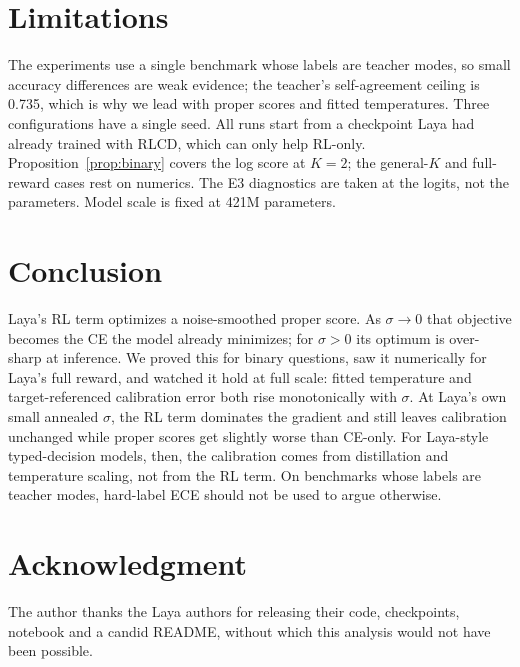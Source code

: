 \documentclass[conference]{IEEEtran}
\begin{document}
\section{Limitations}

The experiments use a single benchmark whose labels are
teacher modes, so small accuracy differences are weak evidence; the teacher's
self-agreement ceiling is 0.735, which is why we lead with proper scores and
fitted temperatures. Three configurations have a single seed. All runs start
from a checkpoint Laya had already trained with RLCD, which can only help
RL-only. Proposition~\ref{prop:binary} covers the log score at $K{=}2$; the
general-$K$ and full-reward cases rest on numerics. The E3 diagnostics are
taken at the logits, not the parameters. Model scale is fixed at 421M
parameters.

\section{Conclusion}

Laya's RL term optimizes a noise-smoothed proper score. As $\sigma\to0$ that
objective becomes the CE the model already minimizes; for $\sigma>0$ its
optimum is over-sharp at inference. We proved this for binary questions, saw
it numerically for Laya's full reward, and watched it hold at full scale:
fitted temperature and target-referenced calibration error both rise
monotonically with $\sigma$. At Laya's own small annealed $\sigma$, the RL term
dominates the gradient and still leaves calibration unchanged while proper
scores get slightly worse than CE-only. For Laya-style typed-decision models,
then, the calibration comes from distillation and temperature scaling, not
from the RL term. On benchmarks whose labels are teacher modes, hard-label ECE
should not be used to argue otherwise.

\section*{Acknowledgment}
The author thanks the Laya authors for releasing their code, checkpoints,
notebook and a candid README, without which this analysis would not have
been possible.




\appendices
\end{document}
